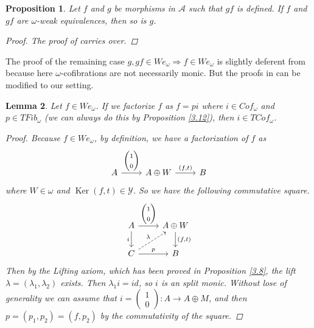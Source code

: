 \documentclass[12pt]{amsart}
\numberwithin{equation}{section}
\newtheorem{lemma}{Lemma}[section]
\newtheorem{proposition}[lemma]{Proposition}
\theoremstyle{definition}
\DeclareMathOperator{\Ker}{Ker}
\newtheorem*{theorem 0*}{Theorem}
\newtheorem*{theorem a*}{Theorem A}
\newtheorem*{theorem b*}{Theorem B}
\numberwithin{diagram}{section}
\begin{document}
\begin{proposition}\label{3.16}
Let $f$ and $g$ be morphisms in $\mathcal{A}$ such that $gf$ is defined.
If $f$ and $gf$ are $\omega$-weak equivalences, then so is $g$.
\begin{proof}
The proof of \cite[Lemma 3.8]{CLZ} carries over.
\end{proof}
\end{proposition}

The proof of the remaining case $g, gf\in We_{\omega}\Rightarrow f\in We_{\omega}$ is slightly deferent from \cite{CLZ} because here $\omega$-cofibrations are not necessarily monic. But the proofs in \cite{CLZ} can be modified to our setting.

\begin{lemma}\label{3.17}
Let $f\in We_{\omega}$. If we factorize $f$ as $f=pi$ where $i\in Cof_{\omega}$ and $p\in TFib_{\omega}$ (we can always do this by Proposition \ref{3.12}), then $i\in TCof_{\omega}$.
\begin{proof}
Because $f\in We_{\omega}$, by definition, we have a factorization of $f$ as
\[\begin{tikzcd}
	A & {A\oplus W} & B
	\arrow["\begin{array}{c} \begin{pmatrix}1\\0\end{pmatrix} \end{array}", from=1-1, to=1-2]
	\arrow["{(f,t)}", from=1-2, to=1-3]
\end{tikzcd}\]
where $W\in \omega$ and $\Ker(f,t)\in\mathcal{Y}$. So we have the following commutative square.
\[\begin{tikzcd}
	A & {A\oplus W} \\
	C & B
	\arrow["\begin{array}{c} \begin{pmatrix} 1\\ 0 \end{pmatrix} \end{array}", from=1-1, to=1-2]
	\arrow["i"', from=1-1, to=2-1]
	\arrow["{(f,t)}", from=1-2, to=2-2]
	\arrow["\lambda", dashed, from=2-1, to=1-2]
	\arrow["p", from=2-1, to=2-2]
\end{tikzcd}\]
Then by the Lifting axiom, which has been proved in Proposition \ref{3.8}, the lift $\lambda=(\lambda_1,\lambda_2)$ exists.
Then $\lambda_1 i=id$, so $i$ is an split monic. Without lose of generality we can assume that $i=\begin{pmatrix} 1\\ 0 \end{pmatrix}:A\rightarrow A\oplus M$, and then $p=(p_1,p_2)=(f,p_2)$ by the commutativity of the square.


\end{proof}
\end{lemma}
\end{document}
